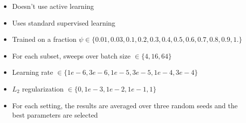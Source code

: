 \documentclass[preview]{standalone}
\begin{document}
\begin{center}
\begin{itemize}
                \item Doesn't use active learning
                \item Uses standard supervised learning
                \item Trained on a fraction $\psi \in \{0.01, 0.03, 0.1, 0.2, 0.3, 0.4, 0.5, 0.6, 0.7, 0.8, 0.9, 1.\}$
                \item For each subset, sweeps over batch size $\in \{4, 16, 64\}$
                \item Learning rate $\in \{1e-6, 3e-6, 1e-5, 3e-5, 1e-4, 3e-4\}$
                \item $L_2$ regularization $\in \{0, 1e-3, 1e-2, 1e-1, 1\}$
                \item For each setting, the results are averaged over three random seeds and the best parameters are selected
            \end{itemize}
\end{center}
\end{document}
